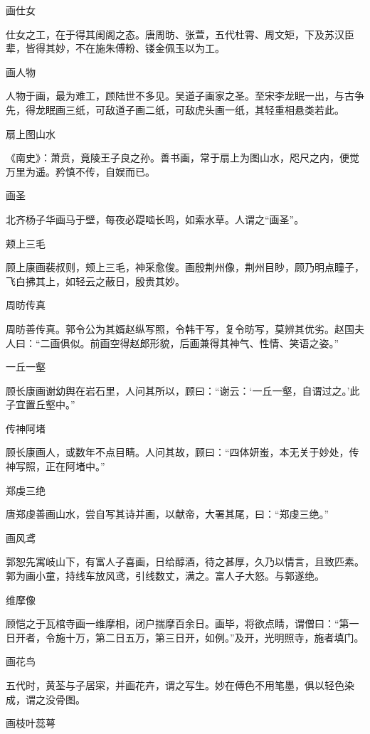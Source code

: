 \documentclass[a4paper,12pt,UTF8,twoside]{ctexbook}
\begin{document}
    画仕女
    
    仕女之工，在于得其闺阁之态。唐周昉、张萱，五代杜霄、周文矩，下及苏汉臣辈，皆得其妙，不在施朱傅粉、镂金佩玉以为工。
    
    画人物
    
    人物于画，最为难工，顾陆世不多见。吴道子画家之圣。至宋李龙眠一出，与古争先，得龙眠画三纸，可敌道子画二纸，可敌虎头画一纸，其轻重相悬类若此。
    
    扇上图山水
    
    《南史》：萧贲，竟陵王子良之孙。善书画，常于扇上为图山水，咫尺之内，便觉万里为遥。矜慎不传，自娱而已。
    
    画圣
    
    北齐杨子华画马于壁，每夜必踶啮长鸣，如索水草。人谓之“画圣”。
    
    颊上三毛
    
    顾上康画裴叔则，颊上三毛，神采愈俊。画殷荆州像，荆州目眇，顾乃明点瞳子，飞白拂其上，如轻云之蔽日，殷贵其妙。
    
    周昉传真
    
    周昉善传真。郭令公为其婿赵纵写照，令韩干写，复令昉写，莫辨其优劣。赵国夫人曰：“二画俱似。前画空得赵郎形貌，后画兼得其神气、性情、笑语之姿。”
    
    一丘一壑
    
    顾长康画谢幼舆在岩石里，人问其所以，顾曰：“谢云：‘一丘一壑，自谓过之。’此子宜置丘壑中。”
    
    传神阿堵
    
    顾长康画人，或数年不点目睛。人问其故，顾曰：“四体妍蚩，本无关于妙处，传神写照，正在阿堵中。”
    
    郑虔三绝
    
    唐郑虔善画山水，尝自写其诗并画，以献帝，大署其尾，曰：“郑虔三绝。”
    
    画风鸢
    
    郭恕先寓岐山下，有富人子喜画，日给醇酒，待之甚厚，久乃以情言，且致匹素。郭为画小童，持线车放风鸢，引线数丈，满之。富人子大怒。与郭遂绝。
    
    维摩像
    
    顾恺之于瓦棺寺画一维摩相，闭户揣摩百余日。画毕，将欲点睛，谓僧曰：“第一日开者，令施十万，第二日五万，第三日开，如例。”及开，光明照寺，施者填门。
    
    画花鸟
    
    五代时，黄荃与子居寀，并画花卉，谓之写生。妙在傅色不用笔墨，俱以轻色染成，谓之没骨图。
    
    画枝叶蕊萼
    
\end{document}
